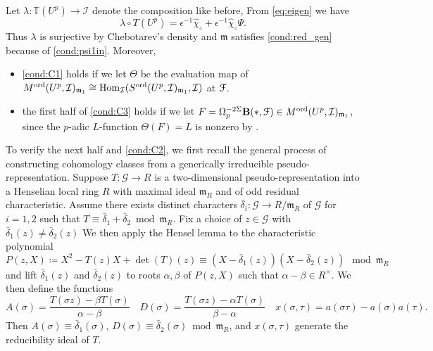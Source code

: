 \documentclass[leqno]{amsart}
\theoremstyle{definition}
\theoremstyle{remark}
\DeclareMathOperator{\Hom}{Hom}
\newcommand{\fm}{\mathfrak{m}}
\newcommand{\TT}{\mathbb{T}} %
\newcommand{\euF}{\EuScript{F}} %
\newcommand{\I}{\mathcal{I}} %
\newcommand{\ord}{\textnormal{ord}} %
\begin{document}
Let $\lambda\colon\TT(U^p)\to \I$ denote the composition like before,
From \eqref{eq:eigen} we have
\[
    \lambda\circ T(U^p)=
    \epsilon^{-1}\hat{\chi}_\circ+
    \epsilon^{-1}\hat{\chi}_\circ\Psi.
\]
Thus $\lambda$ is surjective by Chebotarev's density
and $\fm$ satisfies \eqref{cond:red_gen} because of 
\ref{cond:psi1in}. Moreover, 
\begin{itemize}
\item \ref{cond:C1} holds if we let 
$\Theta$ be the evaluation map 
of $M^{\ord}(U^p,\I)_{\fm_1}\cong \Hom_\I(S^{\ord}(U^p,\I)_{\fm_1},\I)$
at $\euF$.
\item the first half of \ref{cond:C3} holds if we let 
$F=\Omega_p^{-2\Sigma}\mathbf{B}(*,\euF)\in M^{\ord}(U^p,\I)_{\fm_1}$,
since the $p$-adic $L$-function $\Theta(F)=L$ is nonzero by \cite{Hida10}.
\end{itemize}
To verify the next half and \ref{cond:C2}, we first recall the general process 
of constructing cohomology classes from a generically irreducible
pseudo-representation.
Suppose $T\colon \mathcal{G}\to R$
is a two-dimensional pseudo-representation
into a Henselian local ring $R$
with maximal ideal $\fm_R$
and of odd residual characteristic.
Assume there exists distinct characters
$\bar{\delta}_i\colon \mathcal{G}\to R/\fm_R$ of $\mathcal{G}$
for $i=1,2$ such that  
$T\equiv \bar{\delta}_1+\bar{\delta}_2\bmod \fm_R$.
Fix a choice of $z\in \mathcal{G}$
with $\bar{\delta}_1(z)\neq \bar{\delta}_2(z)$
We then apply the Hensel lemma to the characteristic polynomial
\begin{equation*}
    P(z,X)\coloneqq
    X^2-T(z)X+\det(T)(z) \equiv 
    (X-\bar{\delta}_1(z))(X-\bar{\delta}_2(z))
    \mod \fm_R
\end{equation*}
and lift $\bar{\delta}_1(z)$ and $\bar{\delta}_2(z)$ 
to roots $\alpha,\beta$ of $P(z,X)$
such that $\alpha-\beta\in R^\times$.
We then define the functions
\begin{equation}\label{eq:presentation}
   A(\sigma)=
   \frac{T(\sigma z)-\beta T(\sigma)}{\alpha-\beta}\quad
   D(\sigma)=
   \frac{T(\sigma z)-\alpha T(\sigma)}{\beta-\alpha}\quad
   x(\sigma,\tau)=a(\sigma\tau)-a(\sigma)a(\tau).
\end{equation}
Then 
$A(\sigma)\equiv \bar{\delta}_1(\sigma)$,
$D(\sigma)\equiv \bar{\delta}_2(\sigma)\bmod\fm_R$,
and $x(\sigma,\tau)$
generate the reducibility ideal of $T$.
\end{document}
